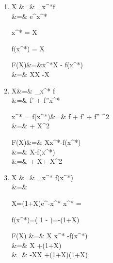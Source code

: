 \begin{enumerate}
\item

\beq
{}
\eeq

\beqa
X &=& \partial_{x^*}f
\\
&=&
e^{x^*}
\eeqa

\beq
x^* = \ln  X
\eeq

\beq
f(x^*) = X
\eeq

\beqa
F(X)&=&x^*X - f(x^*)
\\
&=&
X\ln X -X
\eeqa




\item 
\beq
{}
\eeq

\beqa
X&=&
\partial_{x^*} f
\\
&=&
f' + f''x^*
\label{eq-X-xstar}
\eeqa

\beq
x^* = 
\eeq
\beqa
f(x^*)&=& f
+
f' 
+
f''
^2
\\
&=&
+
X^2
\eeqa

\beqa
F(X)&=&
Xx^*-f(x^*)
\\
&=&
X
-f(x^*)
\\
&=&
+
X
+
X^2
\eeqa

%
%
%
%


\item
\beq
{}
\eeq

\beqa
X
&=&
\partial_{x^*} f(x^*)
\\
&=&
\eeqa

\beq
X=(1+X)e^{-x^*}
\eeq
\beq
x^* = \ln{}
\eeq

\beq
f(x^*)=\ln\left(
1 - 
\right)=-\ln(1+X)
\eeq

\beqa
F(X) &=& X x^* -f(x^*)
\\
&=&
X \ln{}
+\ln(1+X)
\\
&=&
-X\ln  X
+(1+X)\ln(1+X)
\eeqa
\end{enumerate}





